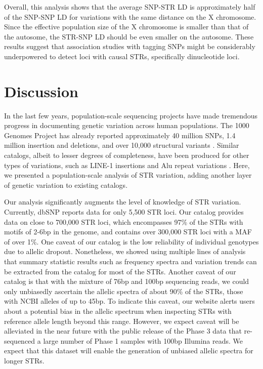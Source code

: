 Overall, this analysis shows that the average SNP-STR LD is approximately half of the SNP-SNP LD for variations with the same distance on the X chromosome. Since the effective population size of the X chromosome is smaller than that of the autosome, the STR-SNP LD should be even smaller on the autosome. These results suggest that association studies with tagging SNPs might be considerably underpowered to detect loci with causal STRs, specifically dinucleotide loci. 

\section{Discussion}
In the last few years, population-scale sequencing projects have made tremendous progress in documenting genetic variation across human populations. The 1000 Genomes Project has already reported approximately 40 million SNPs, 1.4 million insertion and deletions, and over 10,000 structural variants \cite{AbecasisAltshulerAutonEtAl2010} . Similar catalogs, albeit to lesser degrees of completeness, have been produced for other types of variations, such as LINE-1 insertions \cite{EwingKazazian2011} and Alu repeat variations \cite{HormozdiariAlkanVenturaEtAl2011}. Here, we presented a population-scale analysis of STR variation, adding another layer of genetic variation to existing catalogs.  

Our analysis significantly augments the level of knowledge of STR variation. Currently, dbSNP reports data for only 5,500 STR loci. Our catalog provides data on close to 700,000 STR loci, which encompasses 97\% of the STRs with motifs of 2-6bp in the genome, and contains over 300,000 STR loci with a MAF of over 1\%. One caveat of our catalog is the low reliability of individual genotypes due to allelic dropout. Nonetheless, we showed using multiple lines of analysis that summary statistic results such as frequency spectra and variation trends can be extracted from the catalog for most of the STRs. Another caveat of our catalog is that with the mixture of 76bp and 100bp sequencing reads, we could only unbiasedly ascertain the allelic spectra of about 90\% of the STRs, those with NCBI alleles of up to 45bp. To indicate this caveat, our website alerts users about a potential bias in the allelic spectrum when inspecting STRs with reference allele length beyond this range. However, we expect caveat will be alleviated in the near future with the public release of the Phase 3 data that re-sequenced a large number of Phase 1 samples with 100bp Illumina reads. We expect that this dataset will enable the generation of unbiased allelic spectra for longer STRs. 

